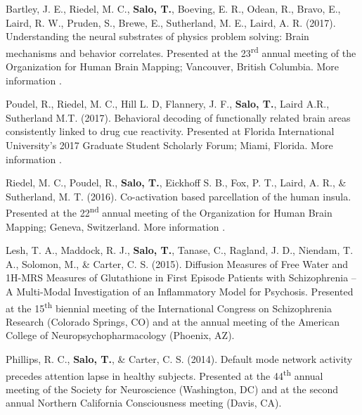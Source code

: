 \documentclass[10pt]{article}
\newcommand{\textlink}[3][blue]{\href{#2}{\color{#1}{#3}}}
\begin{document}
\begin{hangparas}{.25in}{1}
Bartley, J. E., Riedel, M. C., \textbf{Salo, T.}, Boeving, E. R., Odean, R.,
Bravo, E., Laird, R. W., Pruden, S., Brewe, E., Sutherland, M. E., Laird, A. R.
(2017). Understanding the neural substrates of physics problem solving: Brain
mechanisms and behavior correlates. Presented at the 23\textsuperscript{rd}
annual meeting of the Organization for Human Brain Mapping; Vancouver, British
Columbia. More information
\textlink{https://nbclab.github.io/posters/bartley-physics-poster}{here}.

\bigskip

Poudel, R.,  Riedel, M. C., Hill L. D, Flannery, J. F., \textbf{Salo, T.},
Laird A.R., Sutherland M.T. (2017). Behavioral decoding of functionally related
brain areas consistently linked to drug cue reactivity. Presented at Florida
International University's 2017 Graduate Student Scholarly Forum; Miami, Florida.
More information
\textlink{https://nbclab.github.io/posters/poudel-cue-reactivity-poster}{here}.

\bigskip

Riedel, M. C., Poudel, R., \textbf{Salo, T.}, Eickhoff S. B., Fox, P. T.,
Laird, A. R., \& Sutherland, M. T. (2016). Co-activation based parcellation of
the human insula. Presented at the 22\textsuperscript{nd} annual meeting of the
Organization for Human Brain Mapping; Geneva, Switzerland. More information
\textlink{https://osf.io/pqvqy}{here}.

\bigskip

Lesh, T. A., Maddock, R. J., \textbf{Salo, T.}, Tanase, C., Ragland, J. D.,
Niendam, T. A., Solomon, M., \& Carter, C. S. (2015). Diffusion Measures of
Free Water and 1H-MRS Measures of Glutathione in First Episode Patients with
Schizophrenia -- A Multi-Modal Investigation of an Inflammatory Model for
Psychosis. Presented at the 15\textsuperscript{th} biennial meeting of the
International Congress on Schizophrenia Research (Colorado Springs, CO) and at
the annual meeting of the American College of Neuropsychopharmacology (Phoenix,
AZ).

\bigskip

Phillips, R. C., \textbf{Salo, T.}, \& Carter, C. S. (2014). Default mode
network activity precedes attention lapse in healthy subjects. Presented at
the 44\textsuperscript{th} annual meeting of the Society for Neuroscience
(Washington, DC) and at the second annual Northern California Consciousness
meeting (Davis, CA).
\end{hangparas}
\end{document}
